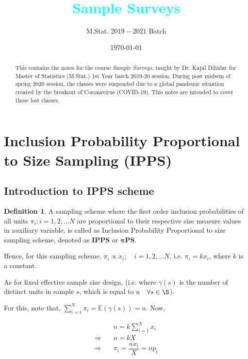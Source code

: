 \documentclass[12pt]{article}
\title{\LARGE \textbf{\textcolor{cyan}{Sample Surveys}}}
\author{M.Stat. $2019-2021$ Batch}
\date{\today}
\newcommand{\E}{\mathbb{E}}
\theoremstyle{definition}
\newtheorem{defn}{Definition}
\newenvironment{definition}{
\begin{tcolorbox}[colback=green!5!white,colframe=green!75!black, parbox = false]\begin{defn} }{\end{defn}\end{tcolorbox} }
\begin{document}
\maketitle

\begin{abstract}
    This contains the notes for the course \textit{Sample Surveys}, taught by Dr. Kajal Dihidar for Master of Statistics (M.Stat.) 1st Year batch 2019-20 session. During post midsem of spring $2020$ session, the classes were suspended due to a global pandemic situation created by the breakout of Coronavirus (COVID-19). This notes are intended to cover those lost classes.
\end{abstract}

\pagebreak

\tableofcontents
\pagebreak


\section{Inclusion Probability Proportional to Size Sampling (IPPS)}

\subsection{Introduction to IPPS scheme}

\begin{definition}
    A sampling scheme where the first order inclusion probabilities of all units $\pi_i; i = 1, 2, \dots N$ are proportional to their respective size measure values in auxiliary variable, is called as Inclusion Probability Proportional to size sampling scheme, denoted as \textbf{IPPS} or $\mathbf{\pi}$\textbf{PS}.
\end{definition}

Hence, for this sampling scheme, $\pi_i \propto x_i; \quad i = 1, 2, \dots N$, i.e. $\pi_i = k x_i$, where $k$ is a constant.

As for fixed effective sample size design, (i.e. where $\gamma(s)$ is the number of distinct units in sample $s$, which is equal to $n \quad \forall s \in \S$).

For this, note that, $\sum_{i=1}^N \pi_i = \E(\gamma(s)) = n$. Now, 

\begin{align*}
    & \quad n = k \sum_{i=1}^N x_i\\
    \Rightarrow & \quad n = k X\\
    \Rightarrow & \quad \pi_i = \dfrac{nx_i}{X} = np_i        
\end{align*}
\end{document}
